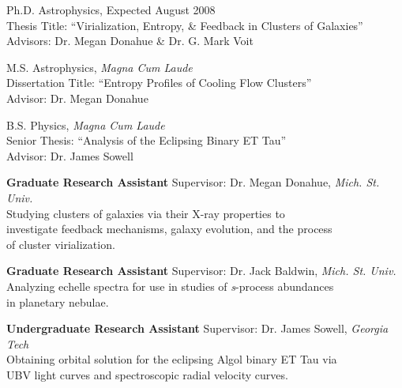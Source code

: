 \documentclass[12pt]{cv}
\begin{document}
\begin{llist}


Ph.D. Astrophysics, Expected August 2008\\
Thesis Title: ``Virialization, Entropy, \& Feedback in Clusters of Galaxies''\\
Advisors: Dr. Megan Donahue \& Dr. G. Mark Voit

M.S. Astrophysics, {\it Magna Cum Laude}\\
Dissertation Title: ``Entropy Profiles of Cooling Flow Clusters''\\
Advisor: Dr. Megan Donahue

B.S. Physics, {\it Magna Cum Laude}\\
Senior Thesis: ``Analysis of the Eclipsing Binary ET Tau''\\
Advisor: Dr. James Sowell


{\sc \bf{Graduate Research Assistant}}
Supervisor: Dr. Megan Donahue, {\textit{Mich. St. Univ.}}\\
Studying clusters of galaxies via their X-ray properties to\\
investigate feedback mechanisms, galaxy evolution, and the process\\
of cluster virialization.

{\sc \bf{Graduate Research Assistant}}
Supervisor: Dr. Jack Baldwin, {\textit{Mich. St. Univ.}}\\
Analyzing echelle spectra for use in studies of {\textit{s}}-process abundances\\
in planetary nebulae.

{\sc \bf{Undergraduate Research Assistant}}
Supervisor: Dr. James Sowell, {\textit{Georgia Tech}}\\
Obtaining orbital solution for the eclipsing Algol binary ET Tau via\\
UBV light curves and spectroscopic radial velocity curves.


\end{llist}
\end{document}
